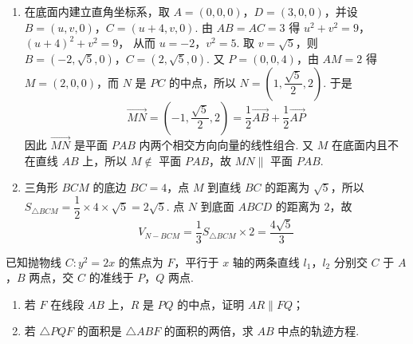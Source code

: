 \begin{solution}
\begin{enumerate}
\item 在底面内建立直角坐标系，取 \(A=(0,0,0)\)，\(D=(3,0,0)\)，并设 \(B=(u,v,0)\)，\(C=(u+4,v,0)\). 由 \(AB=AC=3\) 得
\(u^2+v^2=9\)，\((u+4)^2+v^2=9\)，
从而 \(u=-2\)，\(v^2=5\). 取 \(v=\sqrt5\)，则 \(B=(-2,\sqrt5,0)\)，\(C=(2,\sqrt5,0)\). 又 \(P=(0,0,4)\)，由 \(AM=2\) 得 \(M=(2,0,0)\)，而 \(N\) 是 \(PC\) 的中点，所以 \(N=(1,\dfrac{\sqrt5}{2},2)\). 于是
\[
\overrightarrow{MN}=\left(-1,\frac{\sqrt5}{2},2\right)=\frac12\overrightarrow{AB}+\frac12\overrightarrow{AP}
\]
因此 \(\overrightarrow{MN}\) 是平面 \(PAB\) 内两个相交方向向量的线性组合. 又 \(M\) 在底面内且不在直线 \(AB\) 上，所以 \(M\notin\) 平面 \(PAB\)，故 \(MN\parallel\) 平面 \(PAB\).
\item 三角形 \(BCM\) 的底边 \(BC=4\)，点 \(M\) 到直线 \(BC\) 的距离为 \(\sqrt5\)，所以 \(S_{\triangle BCM}=\dfrac12\times4\times\sqrt5=2\sqrt5\). 点 \(N\) 到底面 \(ABCD\) 的距离为 \(2\)，故
\[
V_{N-BCM}=\frac13S_{\triangle BCM}\times2=\frac{4\sqrt5}{3}
\]
\end{enumerate}
\end{solution}

\begin{problem}
已知抛物线 \(C:y^2=2x\) 的焦点为 \(F\)，平行于 \(x\) 轴的两条直线 \(l_1\)，\(l_2\) 分别交 \(C\) 于 \(A\)，\(B\) 两点，交 \(C\) 的准线于 \(P\)，\(Q\) 两点.

\begin{enumerate}
\item 若 \(F\) 在线段 \(AB\) 上，\(R\) 是 \(PQ\) 的中点，证明 \(AR\parallel FQ\)；
\item 若 \(\triangle PQF\) 的面积是 \(\triangle ABF\) 的面积的两倍，求 \(AB\) 中点的轨迹方程.
\end{enumerate}
\end{problem}

